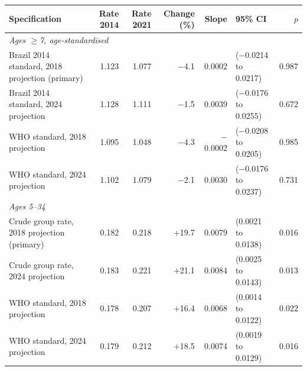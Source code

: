 \begin{tabular}{lrrrrlr}
\toprule
Specification & Rate 2014 & Rate 2021 & Change (\%) & Slope & 95\% CI & $p$ \\
\midrule
\multicolumn{7}{l}{\emph{Ages $\geq$7, age-standardised}} \\
Brazil 2014 standard, 2018 projection (primary) & 1.123 & 1.077 & $-$4.1 & 0.0002 & ($-$0.0214 to 0.0217) & 0.987 \\
Brazil 2014 standard, 2024 projection & 1.128 & 1.111 & $-$1.5 & 0.0039 & ($-$0.0176 to 0.0255) & 0.672 \\
WHO standard, 2018 projection & 1.095 & 1.048 & $-$4.3 & $-$0.0002 & ($-$0.0208 to 0.0205) & 0.985 \\
WHO standard, 2024 projection & 1.102 & 1.079 & $-$2.1 & 0.0030 & ($-$0.0176 to 0.0237) & 0.731 \\
\midrule
\multicolumn{7}{l}{\emph{Ages 5--34}} \\
Crude group rate, 2018 projection (primary) & 0.182 & 0.218 & +19.7 & 0.0079 & (0.0021 to 0.0138) & 0.016 \\
Crude group rate, 2024 projection & 0.183 & 0.221 & +21.1 & 0.0084 & (0.0025 to 0.0143) & 0.013 \\
WHO standard, 2018 projection & 0.178 & 0.207 & +16.4 & 0.0068 & (0.0014 to 0.0122) & 0.022 \\
WHO standard, 2024 projection & 0.179 & 0.212 & +18.5 & 0.0074 & (0.0019 to 0.0129) & 0.016 \\
\bottomrule
\end{tabular}
